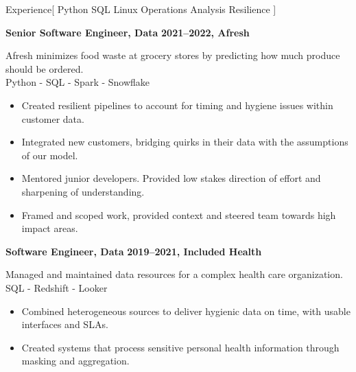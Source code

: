 \documentclass[11pt,a4paper]{article}
\begin{document}
\begin{mysection}{Experience}[
    Python
    \textbullet{} SQL
    \textbullet{} Linux
    \textbullet{} Operations
    \textbullet{} Analysis
    \textbullet{} Resilience
]
  \begin{addmargin}[0.5em]{0em}
    {\large\bfseries Senior Software Engineer, Data}%
    \hfill {\bfseries 2021--2022, Afresh}%
    \begin{adjustwidth}{1ex}{0ex}
      Afresh minimizes food waste at grocery stores by predicting how much
      produce should be ordered.\\
      Python - SQL - Spark - Snowflake

      \begin{itemize}
        [label=-, topsep=0pt, itemsep=0.5ex, parsep=0pt, leftmargin=1em]
      \item Created resilient pipelines to account for timing and hygiene issues
            within customer data.
      \item Integrated new customers, bridging quirks in their data with the
            assumptions of our model.
      \item Mentored junior developers.  Provided low stakes direction of effort
            and sharpening of understanding.
      \item Framed and scoped work, provided context and steered team towards
            high impact areas.
      \end{itemize}
    \end{adjustwidth}
  \end{addmargin}
  \medskip


  \begin{addmargin}[0.5em]{0em}
    {\large\bfseries Software Engineer, Data}%
    \hfill {\bfseries 2019--2021, Included Health}%
      \begin{adjustwidth}{1ex}{0ex}
      Managed and maintained data resources for a complex health care
      organization.\\
      SQL - Redshift - Looker

      \begin{itemize}
        [label=-, topsep=0pt, itemsep=0.5ex, parsep=0pt, leftmargin=1em]
      \item Combined heterogeneous sources to deliver hygienic data on time,
          with usable interfaces and SLAs.
      \item Created systems that process sensitive personal health information
            through masking and aggregation.
      \end{itemize}
      \end{adjustwidth}
    \end{addmargin}
    \medskip



\end{mysection}
\end{document}
